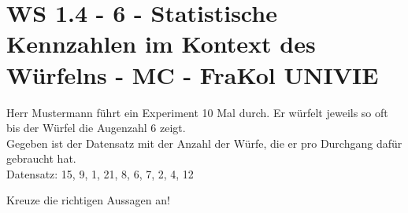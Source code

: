 \section{WS 1.4 - 6 - Statistische Kennzahlen im Kontext des Würfelns - MC - FraKol UNIVIE}

\begin{beispiel}[WS 1.4]{1}
Herr Mustermann führt ein Experiment 10 Mal durch. Er würfelt jeweils so oft bis der Würfel die Augenzahl 6 zeigt.\\
Gegeben ist der Datensatz mit der Anzahl der Würfe, die er pro Durchgang dafür gebraucht hat.\\
Datensatz: 15, 9, 1, 21, 8, 6, 7, 2, 4, 12

Kreuze die richtigen Aussagen an!
\end{beispiel}